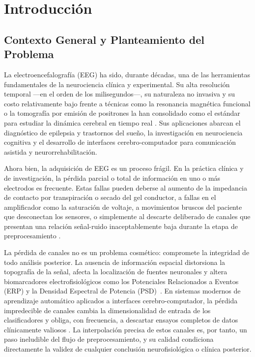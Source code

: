 \chapter{Introducción}

\section{Contexto General y Planteamiento del Problema}

La electroencefalografía (EEG) ha sido, durante décadas, una de las herramientas fundamentales de la neurociencia clínica y experimental. Su alta resolución temporal —en el orden de los milisegundos—, su naturaleza no invasiva y su costo relativamente bajo frente a técnicas como la resonancia magnética funcional o la tomografía por emisión de positrones la han consolidado como el estándar para estudiar la dinámica cerebral en tiempo real \cite{buzsaki2006rhythms}. Sus aplicaciones abarcan el diagnóstico de epilepsia y trastornos del sueño, la investigación en neurociencia cognitiva y el desarrollo de interfaces cerebro-computador para comunicación asistida y neurorrehabilitación.

Ahora bien, la adquisición de EEG es un proceso frágil. En la práctica clínica y de investigación, la pérdida parcial o total de información en uno o más electrodos es frecuente. Estas fallas pueden deberse al aumento de la impedancia de contacto por transpiración o secado del gel conductor, a fallas en el amplificador como la saturación de voltaje, a movimientos bruscos del paciente que desconectan los sensores, o simplemente al descarte deliberado de canales que presentan una relación señal-ruido inaceptablemente baja durante la etapa de preprocesamiento \cite{nunez2006electric}.

La pérdida de canales no es un problema cosmético: compromete la integridad de todo análisis posterior. La ausencia de información espacial distorsiona la topografía de la señal, afecta la localización de fuentes neuronales y altera biomarcadores electrofisiológicos como los Potenciales Relacionados a Eventos (ERP) y la Densidad Espectral de Potencia (PSD)~\cite{luck2014introduction}. En sistemas modernos de aprendizaje automático aplicados a interfaces cerebro-computador, la pérdida impredecible de canales cambia la dimensionalidad de entrada de los clasificadores y obliga, con frecuencia, a descartar ensayos completos de datos clínicamente valiosos \cite{lotte2018review}. La interpolación precisa de estos canales es, por tanto, un paso ineludible del flujo de preprocesamiento, y su calidad condiciona directamente la validez de cualquier conclusión neurofisiológica o clínica posterior.


